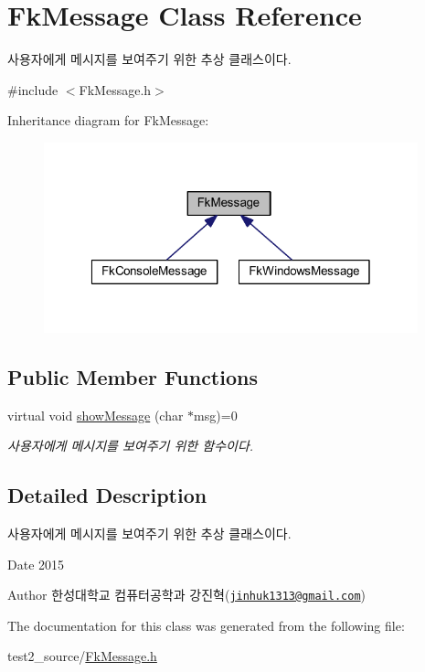 \hypertarget{class_fk_message}{}\section{Fk\+Message Class Reference}
\label{class_fk_message}


사용자에게 메시지를 보여주기 위한 추상 클래스이다.  




{\ttfamily \#include $<$Fk\+Message.\+h$>$}



Inheritance diagram for Fk\+Message\+:
\nopagebreak
\begin{figure}[H]
\begin{center}
\leavevmode
\includegraphics[width=307pt]{class_fk_message__inherit__graph}
\end{center}
\end{figure}
\subsection*{Public Member Functions}
\begin{DoxyCompactItemize}
\item 
\hypertarget{class_fk_message_ac6504c23d90dcd75d62355eac3bbd4d3}{}virtual void \hyperlink{class_fk_message_ac6504c23d90dcd75d62355eac3bbd4d3}{show\+Message} (char $\ast$msg)=0\label{class_fk_message_ac6504c23d90dcd75d62355eac3bbd4d3}

\begin{DoxyCompactList}\small\item\em 사용자에게 메시지를 보여주기 위한 함수이다. \end{DoxyCompactList}\end{DoxyCompactItemize}


\subsection{Detailed Description}
사용자에게 메시지를 보여주기 위한 추상 클래스이다. 

\begin{DoxyDate}{Date}
2015 
\end{DoxyDate}
\begin{DoxyAuthor}{Author}
한성대학교 컴퓨터공학과 강진혁(\href{mailto:jinhuk1313@gmail.com}{\tt jinhuk1313@gmail.\+com}) 
\end{DoxyAuthor}


The documentation for this class was generated from the following file\+:\begin{DoxyCompactItemize}
\item 
test2\+\_\+source/\hyperlink{_fk_message_8h}{Fk\+Message.\+h}\end{DoxyCompactItemize}

